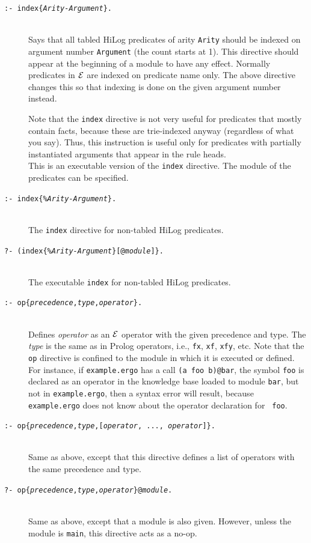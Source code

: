 \documentclass[11pt]{article}
\newcommand{\ERGO}{\mbox{\ensuremath{\cal{E}}\smaller{{\sc{RGO}}}}\xspace}
\newcommand{\FLSYSTEM}{\ERGO}
\newcommand{\ergoext}{ergo\xspace}
\begin{document}
\begin{description}
\item[\texttt{:- index\{\emph{Arity-Argument}\}.}]
  ~~~\\
  Says that all tabled HiLog predicates of arity {\tt Arity} should be indexed on
  argument number {\tt Argument} (the count starts at 1). This directive
  should appear at the beginning of a module to have any effect.
  Normally predicates in \FLSYSTEM are indexed on predicate name only.
  The  above directive changes this so that indexing is done on the given
  argument number instead.

  Note that the {\tt index} directive is not very useful for predicates
  that mostly contain facts, because these are trie-indexed anyway
  (regardless of what you say). Thus, this instruction is useful only for
  predicates with partially instantiated arguments that appear in the rule
  heads.
~~~  \\
  This is an executable version of the {\tt index} directive.  The
  module of the predicates can be specified.
\item[\texttt{:- index\{\emph{\%Arity-Argument}\}.}]
~~~  \\
  The {\tt index} directive for non-tabled HiLog predicates.
\item[\texttt{?- (index\{\emph{\%Arity-Argument}\}[@\emph{module}]\}.}]
~~~  \\
  The executable {\tt index} for non-tabled HiLog predicates.

\item[\texttt{:- op\{{\it precedence},{\it type},{\it operator}\}.}]
 ~~~ \\
  Defines \emph{operator} as an \FLSYSTEM operator with the given precedence
  and type. The \emph{type} is the same as in Prolog operators, i.e.,
  {\tt fx}, {\tt xf}, {\tt xfy}, etc.
  Note that the {\tt op} directive is confined to
  the module in which it is executed or defined. For instance, if
  {\tt example.\ergoext} has a call {\tt (a foo b)@bar}, the symbol {\tt foo} is
  declared as an operator in the knowledge base loaded to module {\tt bar}, but not in
  {\tt example.\ergoext}, then a syntax error will result, because 
   {\tt example.\ergoext} does not know about the operator declaration for {\tt
  foo}.
\item[\texttt{:- op\{{\it precedence},{\it type},[{\it operator}, ..., {\it operator}]\}.}]
~~~  \\
  Same as above, except that this directive defines a list of operators
  with the same precedence and type.
\item[\texttt{?- op\{{\it precedence},{\it type},{\it operator}\}@\emph{module}.}]
 ~~~ \\
  Same as above, except that a module is also given. However, unless the
  module is {\tt main}, this directive acts as a no-op.
\end{description}
\end{document}
